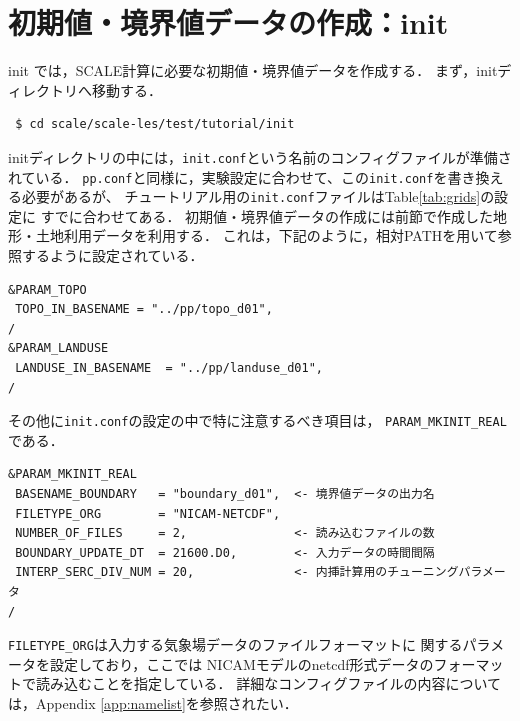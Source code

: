 

\section{初期値・境界値データの作成：init}

init では，SCALE計算に必要な初期値・境界値データを作成する．
まず，initディレクトリへ移動する．
\begin{verbatim}
 $ cd scale/scale-les/test/tutorial/init
\end{verbatim}

initディレクトリの中には，\verb|init.conf|という名前のコンフィグファイルが準備されている．
\verb|pp.conf|と同様に，実験設定に合わせて、この\verb|init.conf|を書き換える必要があるが、
チュートリアル用の\verb|init.conf|ファイルはTable\ref{tab:grids}の設定に
すでに合わせてある．
初期値・境界値データの作成には前節で作成した地形・土地利用データを利用する．
これは，下記のように，相対PATHを用いて参照するように設定されている．

\begin{verbatim}
&PARAM_TOPO
 TOPO_IN_BASENAME = "../pp/topo_d01",
/
&PARAM_LANDUSE
 LANDUSE_IN_BASENAME  = "../pp/landuse_d01",
/
\end{verbatim}
その他に\verb|init.conf|の設定の中で特に注意するべき項目は，
\verb|PARAM_MKINIT_REAL|である．

\begin{verbatim}
&PARAM_MKINIT_REAL
 BASENAME_BOUNDARY   = "boundary_d01",  <- 境界値データの出力名
 FILETYPE_ORG        = "NICAM-NETCDF",
 NUMBER_OF_FILES     = 2,               <- 読み込むファイルの数
 BOUNDARY_UPDATE_DT  = 21600.D0,        <- 入力データの時間間隔
 INTERP_SERC_DIV_NUM = 20,              <- 内挿計算用のチューニングパラメータ
/
\end{verbatim}

\verb|FILETYPE_ORG|は入力する気象場データのファイルフォーマットに
関するパラメータを設定しており，ここでは
NICAMモデルのnetcdf形式データのフォーマットで読み込むことを指定している．
詳細なコンフィグファイルの内容については，Appendix \ref{app:namelist}を参照されたい．

